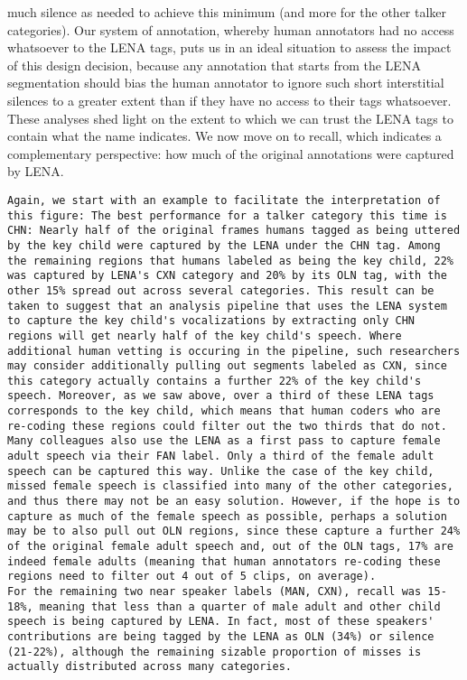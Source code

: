\documentclass[english,floatsintext,man]{apa6}
\begin{document}
much silence as needed to achieve this minimum (and more for the other
talker categories). Our system of annotation, whereby human annotators
had no access whatsoever to the LENA tags, puts us in an ideal situation
to assess the impact of this design decision, because any annotation
that starts from the LENA segmentation should bias the human annotator
to ignore such short interstitial silences to a greater extent than if
they have no access to their tags whatsoever. These analyses shed light
on the extent to which we can trust the LENA tags to contain what the
name indicates. We now move on to recall, which indicates a
complementary perspective: how much of the original annotations were
captured by LENA.

\begin{verbatim}
Again, we start with an example to facilitate the interpretation of this figure: The best performance for a talker category this time is CHN: Nearly half of the original frames humans tagged as being uttered by the key child were captured by the LENA under the CHN tag. Among the remaining regions that humans labeled as being the key child, 22% was captured by LENA's CXN category and 20% by its OLN tag, with the other 15% spread out across several categories. This result can be taken to suggest that an analysis pipeline that uses the LENA system to capture the key child's vocalizations by extracting only CHN regions will get nearly half of the key child's speech. Where additional human vetting is occuring in the pipeline, such researchers may consider additionally pulling out segments labeled as CXN, since this category actually contains a further 22% of the key child's speech. Moreover, as we saw above, over a third of these LENA tags corresponds to the key child, which means that human coders who are re-coding these regions could filter out the two thirds that do not.
Many colleagues also use the LENA as a first pass to capture female adult speech via their FAN label. Only a third of the female adult speech can be captured this way. Unlike the case of the key child, missed female speech is classified into many of the other categories, and thus there may not be an easy solution. However, if the hope is to capture as much of the female speech as possible, perhaps a solution may be to also pull out OLN regions, since these capture a further 24% of the original female adult speech and, out of the OLN tags, 17% are indeed female adults (meaning that human annotators re-coding these regions need to filter out 4 out of 5 clips, on average).
For the remaining two near speaker labels (MAN, CXN), recall was 15-18%, meaning that less than a quarter of male adult and other child speech is being captured by LENA. In fact, most of these speakers' contributions are being tagged by the LENA as OLN (34%) or silence (21-22%), although the remaining sizable proportion of misses is actually distributed across many categories. 
\end{verbatim}
\end{document}
